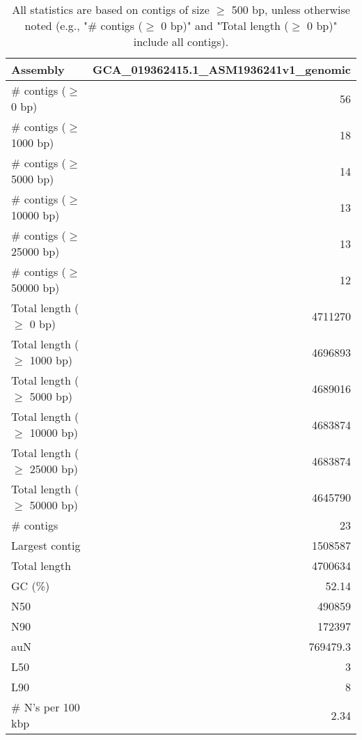 \documentclass[12pt,a4paper]{article}
\begin{document}
\begin{table}[ht]
\begin{center}
\caption{All statistics are based on contigs of size $\geq$ 500 bp, unless otherwise noted (e.g., "\# contigs ($\geq$ 0 bp)" and "Total length ($\geq$ 0 bp)" include all contigs).}
\begin{tabular}{|l*{1}{|r}|}
\hline
Assembly & GCA\_019362415.1\_ASM1936241v1\_genomic \\ \hline
\# contigs ($\geq$ 0 bp) & 56 \\ \hline
\# contigs ($\geq$ 1000 bp) & 18 \\ \hline
\# contigs ($\geq$ 5000 bp) & 14 \\ \hline
\# contigs ($\geq$ 10000 bp) & 13 \\ \hline
\# contigs ($\geq$ 25000 bp) & 13 \\ \hline
\# contigs ($\geq$ 50000 bp) & 12 \\ \hline
Total length ($\geq$ 0 bp) & 4711270 \\ \hline
Total length ($\geq$ 1000 bp) & 4696893 \\ \hline
Total length ($\geq$ 5000 bp) & 4689016 \\ \hline
Total length ($\geq$ 10000 bp) & 4683874 \\ \hline
Total length ($\geq$ 25000 bp) & 4683874 \\ \hline
Total length ($\geq$ 50000 bp) & 4645790 \\ \hline
\# contigs & 23 \\ \hline
Largest contig & 1508587 \\ \hline
Total length & 4700634 \\ \hline
GC (\%) & 52.14 \\ \hline
N50 & 490859 \\ \hline
N90 & 172397 \\ \hline
auN & 769479.3 \\ \hline
L50 & 3 \\ \hline
L90 & 8 \\ \hline
\# N's per 100 kbp & 2.34 \\ \hline
\end{tabular}
\end{center}
\end{table}
\end{document}
